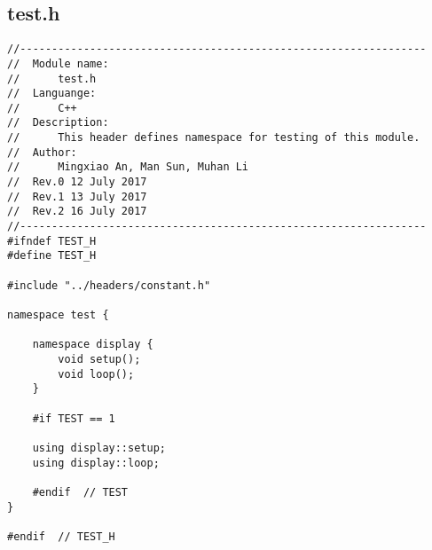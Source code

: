 \subsection{test.h}
\begin{verbatim}
//----------------------------------------------------------------
//  Module name:
//      test.h
//  Languange:
//      C++
//  Description:
//      This header defines namespace for testing of this module.
//  Author:
//      Mingxiao An, Man Sun, Muhan Li
//  Rev.0 12 July 2017
//  Rev.1 13 July 2017
//  Rev.2 16 July 2017
//----------------------------------------------------------------
#ifndef TEST_H
#define TEST_H

#include "../headers/constant.h"

namespace test {
    
    namespace display {
        void setup();
        void loop();
    }

    #if TEST == 1
    
    using display::setup;
    using display::loop;
    
    #endif  // TEST
}

#endif  // TEST_H

\end{verbatim}


